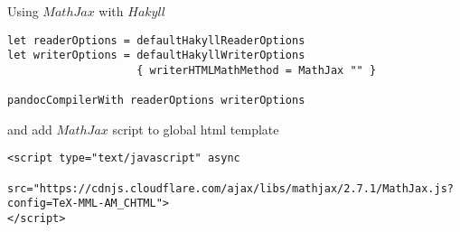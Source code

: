 \documentclass{minimal}
\begin{document}
Using $MathJax$ with $Hakyll$

\begin{verbatim}
let readerOptions = defaultHakyllReaderOptions
let writerOptions = defaultHakyllWriterOptions
                    { writerHTMLMathMethod = MathJax "" }

pandocCompilerWith readerOptions writerOptions

\end{verbatim}

and add $MathJax$ script to global html template

\begin{verbatim}
<script type="text/javascript" async
        src="https://cdnjs.cloudflare.com/ajax/libs/mathjax/2.7.1/MathJax.js?config=TeX-MML-AM_CHTML">
</script>
\end{verbatim}
\end{document}
